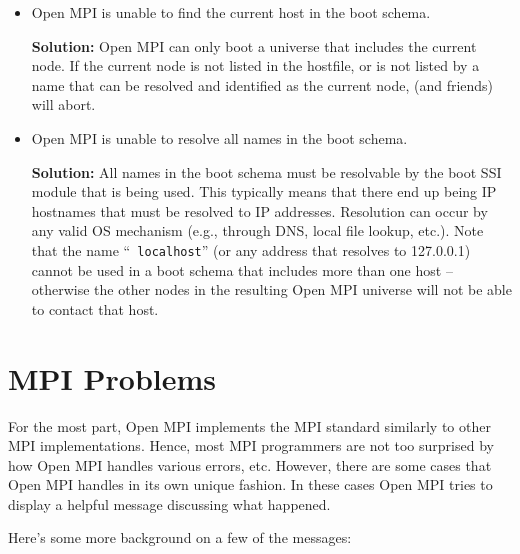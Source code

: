 \begin{itemize}
\item Open MPI is unable to find the current host in the boot schema.

  {\bf Solution:} Open MPI can only boot a universe that includes the
  current node.  If the current node is not listed in the hostfile, or
  is not listed by a name that can be resolved and identified as the
  current node,  (and friends) will abort.

\item Open MPI is unable to resolve all names in the boot schema.

  {\bf Solution:} All names in the boot schema must be resolvable by
  the boot SSI module that is being used.  This typically means that
  there end up being IP hostnames that must be resolved to IP
  addresses.  Resolution can occur by any valid OS mechanism (e.g.,
  through DNS, local file lookup, etc.).  Note that the name ``{\tt
  localhost}'' (or any address that resolves to 127.0.0.1) cannot be
  used in a boot schema that includes more than one host -- otherwise
  the other nodes in the resulting Open MPI universe will not be able to
  contact that host.
\end{itemize}


\section{MPI Problems}

For the most part, Open MPI implements the MPI standard similarly to other
MPI implementations.  Hence, most MPI programmers are not too
surprised by how Open MPI handles various errors, etc.  However, there are
some cases that Open MPI handles in its own unique fashion.  In these cases
Open MPI tries to display a helpful message discussing what happened.  

Here's some more background on a few of the messages:

